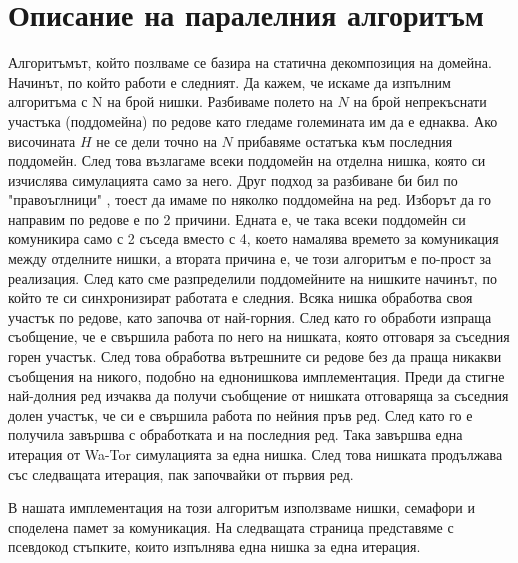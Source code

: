 \documentclass[12pt]{article}
\begin{document}
\section{Описание на паралелния алгоритъм}
Алгоритъмът, който позлваме се базира на статична декомпозиция на домейна.
Начинът, по който работи е следният. Да кажем, че искаме да изпълним алгоритъма с N на брой нишки.
Разбиваме полето на $N$ на брой непрекъснати участъка (поддомейна) по редове като гледаме големината им
да е еднаква. Ако височината $H$ не се дели точно на $N$ прибавяме остатъка към последния поддомейн.
След това възлагаме всеки поддомейн на отделна нишка, която си изчислява симулацията само за него.
Друг подход за разбиване би бил по "правоъглници" , тоест да имаме по няколко поддомейна на ред.
Изборът да го направим по редове е по 2 причини. Едната е, че така всеки поддомейн си комуникира само
с 2 съседа вместо с 4, което намалява времето за комуникация между отделните нишки, а втората причина
е, че този алгоритъм е по-прост за реализация.
\bigbreak
След като сме разпределили поддомейните на нишките начинът, по който те си синхронизират работата е следния.
Всяка нишка обработва своя участък по редове, като започва от най-горния. След като го обработи изпраща
съобщение, че е свършила работа по него на нишката, която отговаря за съседния горен участък.
След това обработва вътрешните си редове без да праща никакви съобщения на никого, подобно на еднонишкова
имплементация. Преди да стигне най-долния ред изчаква да получи съобщение от нишката отговаряща за съседния
долен участък, че си е свършила работа по нейния пръв ред. След като го е получила завършва с обработката
и на последния ред. Така завършва една итерация от Wa-Tor симулацията за една нишка. След това нишката
продължава със следващата итерация, пак започвайки от първия ред.

В нашата имплементация на този алгоритъм използваме нишки, семафори и споделена памет за комуникация.
На следващата страница представяме с псевдокод стъпките, които изпълнява една нишка за една итерация.

\newpage
\end{document}
